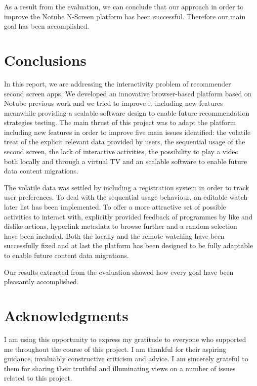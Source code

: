 \documentclass{acm_proc_article-sp}
\begin{document}
As a result from the evaluation, we can conclude that our approach in order to improve the Notube N-Screen platform has been successful. Therefore our main goal has been accomplished. 
\section{Conclusions}

In this report, we are addressing the interactivity problem of recommender second screen apps. We developed an innovative browser-based platform based on Notube previous work and we tried to improve it including new features meanwhile providing a scalable software design to enable future recommendation strategies testing. 
The main thrust of this project was to adapt the platform including new features in order to improve five main issues identified: the volatile treat of the explicit relevant data provided by users, the sequential usage of the second screen, the lack of interactive activities, the possibility to play a video both locally and through a virtual TV and an scalable software to enable future data content migrations. 

The volatile data was settled by including a registration system in order to track user preferences. To deal with the sequential usage behaviour, an editable watch later list has been implemented. To offer a more attractive set of possible activities to interact with, explicitly provided feedback of programmes by like and dislike actions, hyperlink metadata to browse further and a random selection have been included. Both the locally and the remote watching have been successfully fixed and at last the platform has been designed to be fully adaptable to enable future content data migrations.  

Our results extracted from the evaluation showed how every goal have been pleasantly accomplished. 

\section{Acknowledgments}
I am using this opportunity to express my gratitude to everyone who supported me throughout the course of this project. I am thankful for their aspiring guidance, invaluably constructive criticism and advice. I am sincerely grateful to them for sharing their truthful and illuminating views on a number of issues related to this project.
\end{document}
